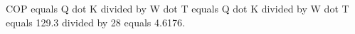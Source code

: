 COP equals Q dot K divided by W dot T equals Q dot K divided by W dot T equals 129.3 divided by 28 equals 4.6176.